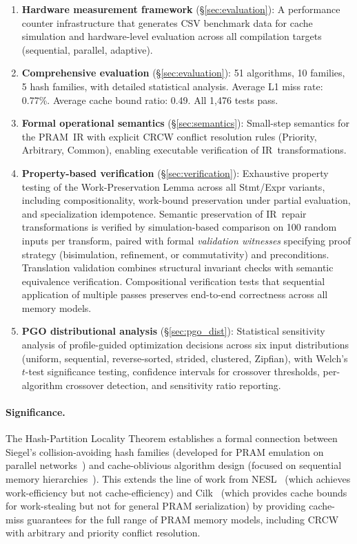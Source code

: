 \documentclass[11pt]{article}
\begin{document}
\begin{enumerate}[leftmargin=*]
\item \textbf{Hardware measurement framework} (\S\ref{sec:evaluation}):
  A performance counter infrastructure that generates CSV benchmark data
  for cache simulation and hardware-level evaluation across all
  compilation targets (sequential, parallel, adaptive).

\item \textbf{Comprehensive evaluation} (\S\ref{sec:evaluation}):
  51 algorithms, 10 families, 5 hash families, with detailed statistical
  analysis.  Average L1 miss rate: 0.77\%.  Average cache bound ratio:
  0.49.  All 1,476 tests pass.

\item \textbf{Formal operational semantics} (\S\ref{sec:semantics}):
  Small-step semantics for the PRAM~IR with explicit CRCW conflict
  resolution rules (Priority, Arbitrary, Common), enabling executable
  verification of IR~transformations.

\item \textbf{Property-based verification} (\S\ref{sec:verification}):
  Exhaustive property testing of the Work-Preservation Lemma across
  all Stmt/Expr variants, including compositionality, work-bound
  preservation under partial evaluation, and specialization idempotence.
  Semantic preservation of IR~repair transformations is verified by
  simulation-based comparison on 100 random inputs per transform,
  paired with formal \emph{validation witnesses}
  specifying proof strategy (bisimulation, refinement,
  or commutativity) and preconditions.  Translation validation
  combines structural invariant checks with semantic equivalence
  verification.  Compositional verification tests that sequential
  application of multiple passes preserves end-to-end correctness
  across all memory models.

\item \textbf{PGO distributional analysis} (\S\ref{sec:pgo_dist}):
  Statistical sensitivity analysis of profile-guided optimization
  decisions across six input distributions (uniform, sequential,
  reverse-sorted, strided, clustered, Zipfian), with Welch's $t$-test
  significance testing, confidence intervals for crossover thresholds,
  per-algorithm crossover detection, and sensitivity ratio reporting.
\end{enumerate}

\paragraph{Significance.}
The Hash-Partition Locality Theorem establishes a formal connection
between Siegel's collision-avoiding hash families (developed for PRAM
emulation on parallel networks~\cite{siegel2004universal}) and
cache-oblivious algorithm design (focused on sequential memory
hierarchies~\cite{frigo1999cache}).  This extends the line of work from
NESL~\cite{blelloch1996programming} (which achieves work-efficiency but
not cache-efficiency) and Cilk~\cite{frigo1998implementation} (which
provides cache bounds for work-stealing but not for general PRAM
serialization) by providing cache-miss guarantees for the full range of
PRAM memory models, including CRCW with arbitrary and priority conflict
resolution.
\end{document}
